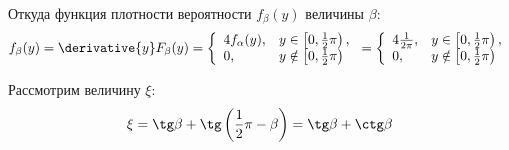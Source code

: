\documentclass[12pt,a4paper]{article}
\begin{document}
    Откуда функция плотности вероятности $f_\beta(y)$ величины $\beta$:
    \begin{equation}
        f_\beta(y) = \derivative{y} F_\beta(y)
        = \left \{
        \begin{array}{ll}
            4 f_\alpha(y), & y \in \left [ 0, \frac{1}{2} \pi \right ),   \\
            0,             & y \notin \left [ 0, \frac{1}{2} \pi \right )
        \end{array}
        \right .
        = \left \{
        \begin{array}{ll}
            4 \frac{1}{2 \pi}, & y \in \left [ 0, \frac{1}{2} \pi \right ),   \\
            0,                 & y \notin \left [ 0, \frac{1}{2} \pi \right )
        \end{array}
        \right .
    \end{equation}

    Рассмотрим величину $\xi$:
    \begin{equation}
        \xi = \tg \beta + \tg \left ( \frac{1}{2} \pi - \beta \right ) = \tg \beta + \ctg \beta
    \end{equation}
\end{document}
